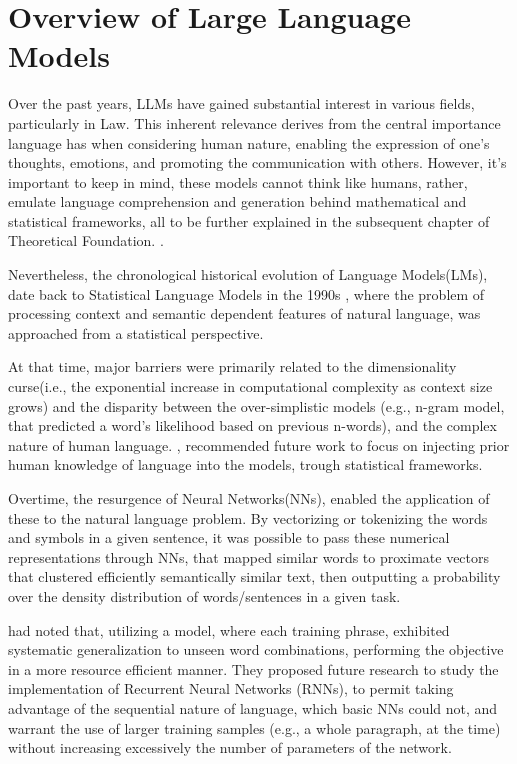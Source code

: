 \documentclass[11pt,a4paper,twoside,openright]{book}
\begin{document}
\section{Overview of Large Language Models}

Over the past years, LLMs have gained substantial interest in various fields, particularly in Law. This inherent relevance derives from the central importance language has when considering human nature, enabling the expression of one's thoughts, emotions, and promoting the communication with others. However, it's important to keep in mind, these models cannot think like humans, rather, emulate language comprehension and generation behind mathematical and statistical frameworks, all to be further explained in the subsequent chapter of Theoretical Foundation. \parencite{wang_history_llms_2024,naveed_comprehensive_overview_llms_2024}.

\par Nevertheless, the chronological historical evolution of Language Models(LMs), date back to Statistical Language Models in  the 1990s \parencite{rosenfeld_two_2000}, where the problem of processing context and semantic dependent features of natural language, was approached from a statistical perspective.


At that time, major barriers were primarily related to the dimensionality curse(i.e., the exponential increase in computational complexity as context size grows) and the disparity between the over-simplistic models (e.g., n-gram model, that predicted a word's likelihood based on previous n-words), and the complex nature of human language. \textcite{rosenfeld_two_2000}, recommended future work to focus on injecting prior human knowledge of language into the models, trough statistical frameworks.

\par Overtime, the resurgence of Neural Networks(NNs), enabled the application of these to the natural language problem. By vectorizing or tokenizing the words and symbols in a given sentence, it was possible to pass these numerical representations through NNs, that mapped similar words to proximate vectors that clustered efficiently semantically similar text, then outputting a probability over the density distribution of words/sentences in a given task. 

\textcite{bengio_neural_2000} had noted that, utilizing a model, where each training phrase, exhibited systematic generalization to unseen word combinations, performing the objective in a more resource efficient manner. They proposed future research to study the implementation of Recurrent Neural Networks (RNNs), to permit taking advantage of the sequential nature of language, which basic NNs could not, and warrant the use of larger training samples (e.g., a whole paragraph, at the time) without increasing excessively the number of parameters of the network.
\end{document}
